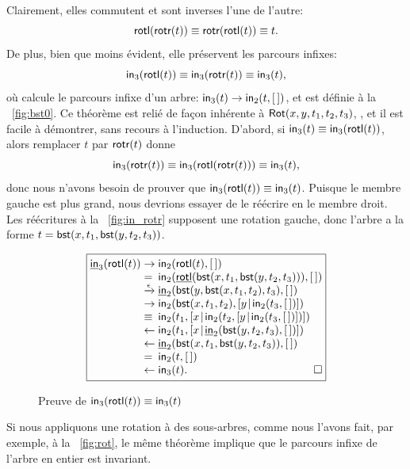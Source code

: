 Clairement, elles commutent et sont inverses l'une de l'autre:
\begin{equation*}
\textsf{rotl}(\textsf{rotr}(t)) \equiv \textsf{rotr}(\textsf{rotl}(t)) \equiv t.
\end{equation*}
De plus, bien que moins évident, elle préservent les parcours infixes:
\begin{equation*}
  \textsf{in}_3(\textsf{rotl}(t)) \equiv \textsf{in}_3(\textsf{rotr}(t)) \equiv
  \textsf{in}_3(t),
\end{equation*}
où  calcule le parcours
infixe d'un arbre: \(\textsf{in}_3(t) \rightarrow \textsf{in}_2(t,[\,])\), et
 est définie à la
\fig~\vref{fig:bst0}. Ce théorème est relié de façon inhérente à
\(\textsf{Rot}({x,y,t_1,t_2,t_3})\),
, et il est facile à démontrer, sans recours à
l'induction. D'abord, si \(\textsf{in}_3(t) \equiv
\textsf{in}_3(\textsf{rotl}(t))\), alors remplacer \(t\) par
\(\textsf{rotr}(t)\) donne
\begin{equation*}
  \textsf{in}_3(\textsf{rotr}(t))
  \equiv \textsf{in}_3(\textsf{rotl}(\textsf{rotr}(t))) \equiv \textsf{in}_3(t),
\end{equation*}
donc nous n'avons besoin de prouver que \(\textsf{in}_3(\textsf{rotl}(t))
\equiv \textsf{in}_3(t)\). Puisque le membre gauche est plus grand, nous
devrions essayer de le réécrire en le membre droit. Les réécritures à
la \fig~\vref{fig:in_rotr} supposent une rotation gauche, donc l'arbre
a la forme \(t=\textsf{bst}(x,t_1,\textsf{bst}(y,t_2,t_3))\).
\begin{figure}
  \begin{equation*}
    \boxed{
      \begin{array}{@{}r@{\;}l@{\;}l@{}}
  \ufun{in}_3(\fun{rotl}(t))
  & \rightarrow & \fun{in}_2(\fun{rotl}(t),\el)\\
  & = & \fun{in}_2(\ufun{rotl}(\fun{bst}(x,t_1,\fun{bst}(y,t_2,t_3))),\el)\\
  & \xrightarrow{\smash{\epsilon}} &
  \ufun{in}_2(\fun{bst}(y,\fun{bst}(x,t_1,t_2),t_3),\el)\\
  & \rightarrow &
  \fun{in}_2(\fun{bst}(x,t_1,t_2),\cons{y}{\fun{in}_2(t_3,\el)})\\
  & \equiv &
 \fun{in}_2(t_1,\cons{x}{\fun{in}_2(t_2,\cons{y}{\fun{in}_2(t_3,\el)})})\\
  & \leftarrow &
  \fun{in}_2(t_1,\cons{x}{\ufun{in}_2(\fun{bst}(y,t_2,t_3),\el)})\\
  & \leftarrow &
  \ufun{in}_2(\fun{bst}(x,t_1,\fun{bst}(y,t_2,t_3)),\el)\\
  & = &
  \fun{in}_2(t,\el)\\
  & \leftarrow &
  \fun{in}_3(t).\hfill\Box
\end{array}
}
\end{equation*}
\caption{Preuve de \(\textsf{in}_3(\textsf{rotl}(t)) \equiv \textsf{in}_3(t)\)}
\label{fig:in_rotr}
\end{figure}
Si nous appliquons une rotation à des sous-arbres, comme nous l'avons
fait, par exemple, à la \fig~\vref{fig:rot}, le même théorème implique
que le parcours infixe de l'arbre en entier est invariant.

